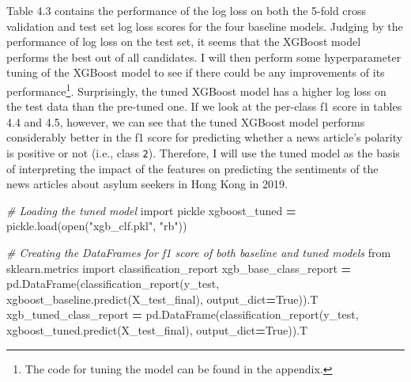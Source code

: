 \documentclass[a4paper, oneside]{report}
\newenvironment{Shaded}{\begin{snugshade}}{\end{snugshade}}
\newcommand{\AttributeTok}[1]{\textcolor[rgb]{0.77,0.63,0.00}{#1}}
\newcommand{\BuiltInTok}[1]{#1}
\newcommand{\CommentTok}[1]{\textcolor[rgb]{0.56,0.35,0.01}{\textit{#1}}}
\newcommand{\DecValTok}[1]{\textcolor[rgb]{0.00,0.00,0.81}{#1}}
\newcommand{\FunctionTok}[1]{\textcolor[rgb]{0.00,0.00,0.00}{#1}}
\newcommand{\ImportTok}[1]{#1}
\newcommand{\NormalTok}[1]{#1}
\newcommand{\OperatorTok}[1]{\textcolor[rgb]{0.81,0.36,0.00}{\textbf{#1}}}
\newcommand{\SpecialCharTok}[1]{\textcolor[rgb]{0.00,0.00,0.00}{#1}}
\newcommand{\StringTok}[1]{\textcolor[rgb]{0.31,0.60,0.02}{#1}}
\newcommand{\VariableTok}[1]{\textcolor[rgb]{0.00,0.00,0.00}{#1}}
\renewenvironment{Shaded}
{
  \vspace{4pt}%
  \begin{snugshade}%
}{%
  \end{snugshade}%
  \vspace{4pt}%
}
\begin{document}
Table 4.3 contains the performance of the log loss on both the 5-fold
cross validation and test set log loss scores for the four baseline
models. Judging by the performance of log loss on the test set, it seems
that the XGBoost model performs the best out of all candidates. I will
then perform some hyperparameter tuning of the XGBoost model to see if
there could be any improvements of its performance\footnote{The code for
  tuning the model can be found in the appendix.}. Surprisingly, the
tuned XGBoost model has a higher log loss on the test data than the
pre-tuned one. If we look at the per-class f1 score in tables 4.4 and
4.5, however, we can see that the tuned XGBoost model performs
considerably better in the f1 score for predicting whether a news
article's polarity is positive or not (i.e., class \texttt{2}).
Therefore, I will use the tuned model as the basis of interpreting the
impact of the features on predicting the sentiments of the news articles
about asylum seekers in Hong Kong in 2019.

\begin{Shaded}
\begin{Highlighting}[]
\CommentTok{\# Loading the tuned model}
\ImportTok{import}\NormalTok{ pickle}
\NormalTok{xgboost\_tuned }\OperatorTok{=}\NormalTok{ pickle.load(}\BuiltInTok{open}\NormalTok{(}\StringTok{"xgb\_clf.pkl"}\NormalTok{, }\StringTok{"rb"}\NormalTok{))}

\CommentTok{\# Creating the DataFrames for f1 score of both baseline and tuned models}
\ImportTok{from}\NormalTok{ sklearn.metrics }\ImportTok{import}\NormalTok{ classification\_report}
\NormalTok{xgb\_base\_class\_report }\OperatorTok{=}\NormalTok{ pd.DataFrame(classification\_report(y\_test, xgboost\_baseline.predict(X\_test\_final), output\_dict}\OperatorTok{=}\VariableTok{True}\NormalTok{)).T}
\NormalTok{xgb\_tuned\_class\_report }\OperatorTok{=}\NormalTok{ pd.DataFrame(classification\_report(y\_test, xgboost\_tuned.predict(X\_test\_final), output\_dict}\OperatorTok{=}\VariableTok{True}\NormalTok{)).T}
\end{Highlighting}
\end{Shaded}

\begin{Shaded}
\end{Shaded}
\end{document}
